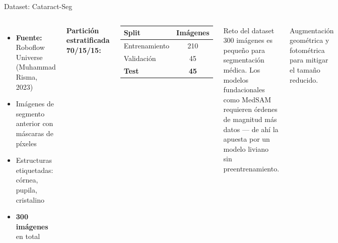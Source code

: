 \documentclass[aspectratio=169]{beamer}
\begin{document}
\begin{frame}{Dataset: Cataract-Seg}
\begin{columns}
\begin{itemize}
    \item \textbf{Fuente:} Roboflow Universe (Muhammad Risma, 2023)
    \item Imágenes de segmento anterior con máscaras de píxeles
    \item Estructuras etiquetadas: córnea, pupila, cristalino
    \item \textbf{300 imágenes} en total
\end{itemize}
\vspace{0.4em}
\textbf{Partición estratificada 70/15/15:}
\begin{center}
\begin{tabular}{lc}
\hline
Split & Imágenes \\
\hline
Entrenamiento & 210 \\
Validación    & 45  \\
\textbf{Test} & \textbf{45}  \\
\hline
\end{tabular}
\end{center}

\begin{block}{Reto del dataset}
300 imágenes es pequeño para segmentación médica. Los modelos fundacionales como MedSAM requieren órdenes de magnitud más datos — de ahí la apuesta por un modelo liviano sin preentrenamiento.
\end{block}
\vspace{0.3em}
{\small Augmentación geométrica y fotométrica para mitigar el tamaño reducido.}
\end{columns}
\end{frame}
\end{document}
